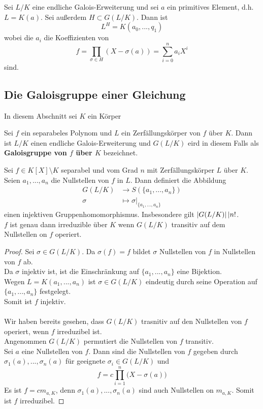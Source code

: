 	\begin{theorem}
		Sei $L/K$ eine endliche Galois-Erweiterung und sei $a$ ein primitives Element, d.h. $L=K(a)$. Sei außerdem $H\subset G(L/K)$. Dann ist\[L^H=K(a_0,...,q_1)\]
		wobei die $a_i$ die Koeffizienten von
		\[f=\prod_{\sigma\in H}(X-\sigma(a))=\sum_{i=0}^{n}a_iX^i\]
		sind.
	\end{theorem}

	
	
	\subsection{Die Galoisgruppe einer Gleichung}
	In diesem Abschnitt sei $K$ ein Körper
	\begin{definition}
		Sei $f$ ein separabeles Polynom und $L$ ein Zerfällungskörper von $f$ über $K$. Dann ist $L/K$ einen endliche Galois-Erweiterung und $G(L/K)$ eird in diesem Falls als \textbf{Galoisgruppe von $f$ über $K$} bezeichnet.
	\end{definition}

	\begin{satz}
		Sei $f\in K[X]\setminus K$ separabel und vom Grad $n$ mit Zerfällungskörper $L$ über $K$.\\
		Seien $a_1,...,a_n$ die Nullstellen von $f$ in $L$. Dann definiert die Abbildung
		\begin{align*}
		G(L/K)&\to S(\{a_1,...,a_n\})\\
		\sigma&\mapsto\sigma|_{\{a_1,...,a_n\}}
		\end{align*}
		einen injektiven Gruppenhomomorphismus. Insbesondere gilt $\left|G(L/K)\right||n!$.\\
		$f$ ist genau dann irreduzible über $K$ wenn $G(L/K)$ transitiv auf dem Nullstellen on $f$ operiert.
	\end{satz}
	\begin{proof}
		Sei $\sigma\in G(L/K)$. Da $\sigma(f)=f$ bildet $\sigma$ Nullstellen von $f$ in Nullstellen von $f$ ab.\\
		Da $\sigma$ injektiv ist, ist die Einschränkung auf $\{a_1,...,a_n\}$ eine Bijektion.\\
		Wegen $L=K(a_1,...,a_n)$ ist $\sigma\in G(L/K)$ eindeutig durch seine Operation auf $\{a_1,...,a_n\}$ festgelegt.\\
		Somit ist $f$ injektiv.\\
		\\
		Wir haben bereits gesehen, dass $G(L/K)$ trasnitiv auf den Nullstellen von $f$ operiert, wenn $f$ irreduzibel ist.\\
		Angenommen $G(L/K)$ permutiert die Nullstellen von $f$ transitiv.\\
		Sei $a$ eine Nullstellen von $f$. Dann sind die Nullstellen von $f$ gegeben durch $\sigma_1(a),...,\sigma_n(a)$ für geeignete $\sigma_i\in G(L/K)$ und
		\[f=c\prod_{i=1}^{n}\big(X-\sigma(a)\big)\]
		Es ist $f=cm_{a,K}$, denn $\sigma_1(a),...,\sigma_n(a)$ sind auch Nullstellen on $m_{a,K}$. Somit ist $f$ irreduzibel.
	\end{proof}

